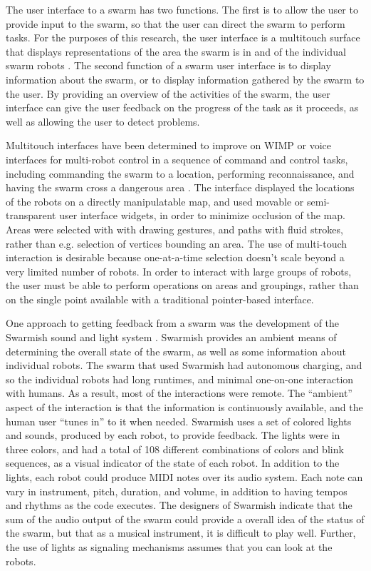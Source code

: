 \documentclass[]{article}
\begin{document}
The user interface to a swarm has two functions. 
The first is to allow the user to provide input to the swarm, so that the user can direct the swarm to perform tasks. 
For the purposes of this research, the user interface is a multitouch surface that displays representations of the area the swarm is in and of the individual swarm robots \cite{micire2009multi}. 
The second function of a swarm user interface is to display information about the swarm, or to display information gathered by the swarm to the user. 
By providing an overview of the activities of the swarm, the user interface can give the user feedback on the progress of the task as it proceeds, as well as allowing the user to detect problems. 

Multitouch interfaces have been determined to improve on WIMP or voice interfaces for multi-robot control in a sequence of command and control tasks, including commanding the swarm to a location, performing reconnaissance, and having the swarm cross a dangerous area \cite{hayes2010multi}.
The interface displayed the locations of the robots on a directly manipulatable map, and used movable or semi-transparent user interface widgets, in order to minimize occlusion of the map. 
Areas were selected with with drawing gestures, and paths with fluid strokes, rather than e.g. selection of vertices bounding an area.
The use of multi-touch interaction is desirable because one-at-a-time selection doesn't scale beyond a very limited number of robots.
In order to interact with large groups of robots, the user must be able to perform operations on areas and groupings, rather than on the single point available with a traditional pointer-based interface. 

One approach to getting feedback from a swarm was the development of the Swarmish sound and light system \cite{mclurkin2006speaking}. 
Swarmish provides an ambient means of determining the overall state of the swarm, as well as some information about individual robots. 
The swarm that used Swarmish had autonomous charging, and so the individual robots had long runtimes, and minimal one-on-one interaction with humans. 
As a result, most of the interactions were remote.
The ``ambient'' aspect of the interaction is that the information is continuously available, and the human user ``tunes in'' to it when needed. 
Swarmish uses a set of colored lights and sounds, produced by each robot, to provide feedback. 
The lights were in three colors, and had a total of 108 different combinations of colors and blink sequences, as a visual indicator of the state of each robot. 
In addition to the lights, each robot could produce MIDI notes over its audio system. 
Each note can vary in instrument, pitch, duration, and volume, in addition to having tempos and rhythms as the code executes. 
The designers of Swarmish indicate that the sum of the audio output of the swarm could provide a overall idea of the status of the swarm, but that as a musical instrument, it is difficult to play well. 
Further, the use of lights as signaling mechanisms assumes that you can look at the robots. 
\end{document}
